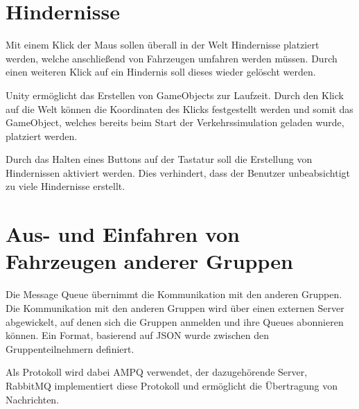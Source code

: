 \section{Hindernisse}
\label{Hindernisse}

Mit einem Klick der Maus sollen überall in der Welt Hindernisse platziert werden, welche anschließend von Fahrzeugen umfahren werden müssen. Durch einen weiteren Klick auf ein Hindernis soll dieses wieder gelöscht werden. 

Unity ermöglicht das Erstellen von GameObjects zur Laufzeit. Durch den Klick auf die Welt können die Koordinaten des Klicks festgestellt werden und somit das GameObject, welches bereits beim Start der Verkehrssimulation geladen wurde, platziert werden.

Durch das Halten eines Buttons auf der Tastatur soll die Erstellung von Hindernissen aktiviert werden. Dies verhindert, dass der Benutzer unbeabsichtigt zu viele Hindernisse erstellt.

\section{Aus- und Einfahren von Fahrzeugen anderer Gruppen}

Die Message Queue übernimmt die Kommunikation mit den anderen Gruppen. Die Kommunikation mit den anderen Gruppen wird über einen externen Server abgewickelt, auf denen sich die Gruppen anmelden und ihre Queues abonnieren können. Ein Format, basierend auf JSON wurde zwischen den Gruppenteilnehmern definiert.

Als Protokoll wird dabei AMPQ verwendet, der dazugehörende Server, RabbitMQ implementiert diese Protokoll und ermöglicht die Übertragung von Nachrichten.